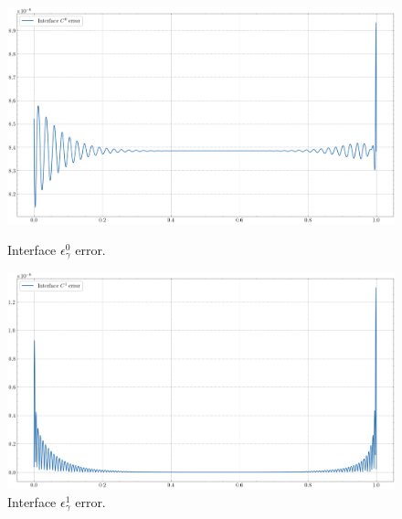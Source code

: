 \begin{figure}[!htb]
    \centering
    \begin{minipage}{.5\textwidth}
      \centering
      \includegraphics[width=1\linewidth]{Images/Transmission/L_shape_2_axis_c0_error_k1_2_enr.png}
      \caption{Interface \(\epsilon_\gamma^0\) error.}
      \label{transmission_L_axis_error_c0_k1_2}
    \end{minipage}%
    \begin{minipage}{.5\textwidth}
      \centering
      \includegraphics[width=1\linewidth]{Images/Transmission/L_shape_2_axis_c1_error_k1_2_enr.png}
      \caption{Interface \(\epsilon_\gamma^1\) error.}
      \label{transmission_L_axis_error_c1_k1_2}
    \end{minipage}

    \vspace{0.5cm} %


\end{figure}
